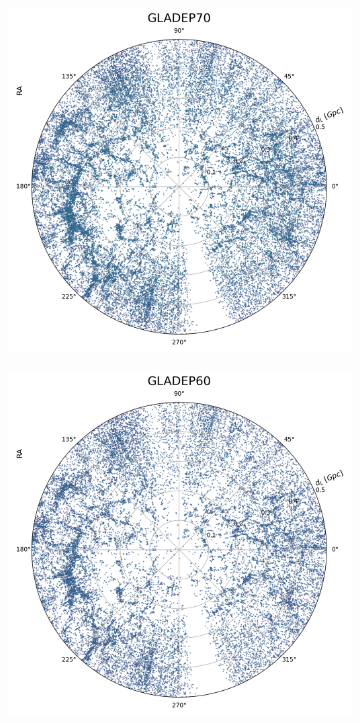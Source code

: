\begin{figure}[h!]
\begin{subfigure}{0.32\textwidth}
    \label{fig:gladep80}
  \end{subfigure}
  \vspace{0.5em}
  \begin{subfigure}{0.32\textwidth}
    \includegraphics[width=\linewidth]{figures/test_frame_g_3.png}
    \label{fig:gladep70}
  \end{subfigure}
  \begin{subfigure}{0.32\textwidth}
    \includegraphics[width=\linewidth]{figures/test_frame_g_4.png}

\end{subfigure}
\end{figure}
